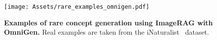 \begin{figure}[htp]
  \centering
   \texttt{[image: Assets/rare\_examples\_omnigen.pdf]}
   \caption{\textbf{Examples of rare concept generation using ImageRAG with OmniGen.}
   Real examples are taken from the iNaturalist~\cite{van2018inaturalist}  dataset.
 }  

   \label{fig:rare_o}
\end{figure}